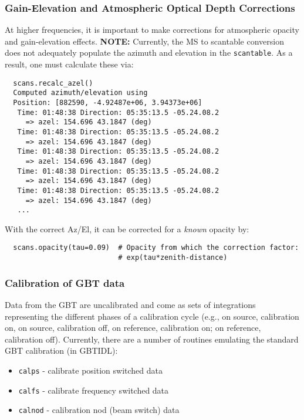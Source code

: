 \subsubsection{Gain-Elevation and Atmospheric Optical Depth Corrections}
\label{subsubsection:sd.asap.calib.gain}

At higher frequencies, it is important to make corrections for
atmospheric opacity and gain-elevation effects. {\bf NOTE:} Currently,
the MS to scantable conversion does not adequately populate the
azimuth and elevation in the {\tt scantable}. As a result, one must
calculate these via:

\small
\begin{verbatim}
  scans.recalc_azel()
  Computed azimuth/elevation using 
  Position: [882590, -4.92487e+06, 3.94373e+06]
   Time: 01:48:38 Direction: 05:35:13.5 -05.24.08.2
     => azel: 154.696 43.1847 (deg)
   Time: 01:48:38 Direction: 05:35:13.5 -05.24.08.2
     => azel: 154.696 43.1847 (deg)
   Time: 01:48:38 Direction: 05:35:13.5 -05.24.08.2
     => azel: 154.696 43.1847 (deg)
   Time: 01:48:38 Direction: 05:35:13.5 -05.24.08.2
     => azel: 154.696 43.1847 (deg)
   Time: 01:48:38 Direction: 05:35:13.5 -05.24.08.2
     => azel: 154.696 43.1847 (deg)
   ...
\end{verbatim}
\normalsize


With the correct Az/El, it can be corrected for a {\it known}
opacity by:

\small
\begin{verbatim}
  scans.opacity(tau=0.09)  # Opacity from which the correction factor: 
                           # exp(tau*zenith-distance)
\end{verbatim}
\normalsize


\subsubsection{Calibration of GBT data}
\label{subsubsection:sd.asap.calib.gbt}

Data from the GBT are uncalibrated and come as sets of integrations
representing the different phases of a calibration cycle (e.g., on
source, calibration on, on source, calibration off, on reference,
calibration on; on reference, calibration off). Currently, there are a
number of routines emulating the standard GBT calibration (in GBTIDL):
\begin{itemize}
   \item {\tt calps} - calibrate position switched data
   \item {\tt calfs} - calibrate frequency switched data
   \item {\tt calnod} - calibration nod (beam switch) data
\end{itemize}

